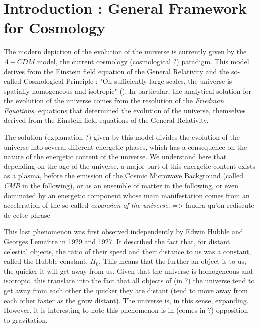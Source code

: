 \section*{Introduction : General Framework for Cosmology}

The modern depiction of the evolution of the universe is currently given by the $\Lambda -CDM$ model, the current cosmology (cosmological ?) paradigm. This model derives from the Einstein field equation of the General Relativity and the so-called Cosmological Principle : "On sufficiently large scales, the universe is spatially homogeneous and isotropic" (\cite{MBW}). In particular, the analytical solution for the evolution of the universe comes from the resolution of the \textit{Friedman Equations}, equations that determined the evolution of the universe, themselves derived from the Einstein field equations of the General Relativity.

The solution (explanation ?) given by this model divides the evolution of the universe into several different energetic phases, which has a consequence on the nature of the energetic content of the universe. We understand here that depending on the age of the universe, a major part of this energetic content exists as a plasma, before the emission of the Cosmic Microwave Background (called \textit{CMB} in the following), or as an ensemble of matter in the following, or even dominated by an energetic component whose main manifestation comes from an acceleration of the so-called \textit{expansion of the universe}. => faudra qu'on rediscute de cette phrase

This last phenomenon was first observed independently by Edwin Hubble and Georges Lemaître in 1929 and 1927. It described the fact that, for distant celestial objects, the ratio of their speed and their distance to us was a constant, called the Hubble constant, $H_0$. This means that the further an object is to us, the quicker it will get away from us. Given that the universe is homogeneous and isotropic, this translate into the fact that all objects of (in ?) the universe tend to get away from each other the quicker they are distant (tend to move away from each other faster as the grow distant). The universe is, in this sense, expanding. However, it is interesting to note this phenomenon is in (comes in ?) opposition to gravitation.

